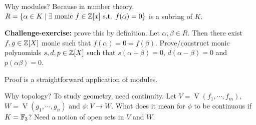     Why modules? Because in number theory, $R = \{\alpha \in K \mid \exists \  \text{monic }f \in \mathbb{Z}[x] \text{ s.t. } f(\alpha) = 0\}$ is a subring of $K$. \par
    \textbf{Challenge-exercise:} prove this by definition. Let $\alpha,\beta \in R$. Then there exist $f,g \in \mathbb{Z}[X]$ monic such that $f(\alpha) = 0 = f(\beta)$. Prove/construct monic polynomials $s,d,p \in \mathbb{Z}[X]$ such that $s(\alpha + \beta) = 0$, $d(\alpha-\beta) = 0$ and $p(\alpha \beta) = 0$. \par
    Proof is a straightforward application of modules. \par
    Why topology? To study geometry, need continuity. Let $V = \operatorname{V}(f_1,\cdots,f_m)$, $W = \operatorname{V}(g_1,\cdots,g_n)$ and $\phi: V \to W$. What does it mean for $\phi$ to be continuous if $K = \mathbb{F}_3$? Need a notion of open sets in $V$ and $W$.


